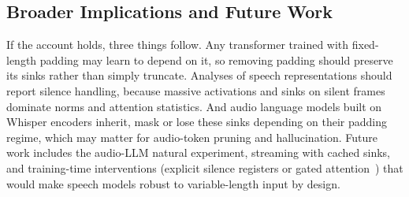 \subsection{Broader Implications and Future Work}

If the account holds, three things follow. Any transformer trained with fixed-length padding may learn to depend on it, so removing padding should preserve its sinks rather than simply truncate. Analyses of speech representations should report silence handling, because massive activations and sinks on silent frames dominate norms and attention statistics. And audio language models built on Whisper encoders inherit, mask or lose these sinks depending on their padding regime, which may matter for audio-token pruning and hallucination. Future work includes the audio-LLM natural experiment, streaming with cached sinks, and training-time interventions (explicit silence registers or gated attention~\cite{qiu2025gated}) that would make speech models robust to variable-length input by design.
